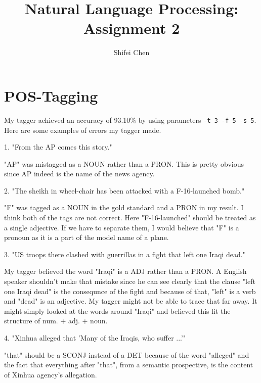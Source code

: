\documentclass[11pt]{article} %
\title{{\LARGE Natural Language Processing: Assignment 2}\\[1.5mm]} %
\author{Shifei Chen} %
\begin{document}
\maketitle

\section{POS-Tagging}

My tagger achieved an accuracy of 93.10\% by using parameters \texttt{-t 3 -f 5 -s 5}. Here are some examples of errors my tagger made.

\begin{displayquote}
  1. "From the AP comes this story."
\end{displayquote}

"AP" was mistagged as a NOUN rather than a PRON. This is pretty obvious since AP indeed is the name of the news agency.

\begin{displayquote}
  2. "The sheikh in wheel-chair has been attacked with a F-16-launched bomb."
\end{displayquote}

"F" was tagged as a NOUN in the gold standard and a PRON in my result. I think both of the tags are not correct. Here "F-16-launched" should be treated as a single adjective. If we have to separate them, I would believe that "F" is a pronoun as it is a part of the model name of a plane.

\begin{displayquote}
  3. "US troops there clashed with guerrillas in a fight that left one Iraqi dead."
\end{displayquote}

My tagger believed the word "Iraqi" is a ADJ rather than a PRON. A English speaker shouldn't make that mistake since he can see clearly that the clause "left one Iraqi dead" is the consequnce of the fight and because of that, "left" is a verb and "dead" is an adjective. My tagger might not be able to trace that far away. It might simply looked at the words around "Iraqi" and believed this fit the structure of num. + adj. + noun.

\begin{displayquote}
  4. "Xinhua alleged that 'Many of the Iraqis, who suffer ...'"
\end{displayquote}

"that" should be a SCONJ instead of a DET because of the word "alleged" and the fact that everything after "that", from a semantic prospective, is the content of Xinhua agency's allegation.
\end{document}
